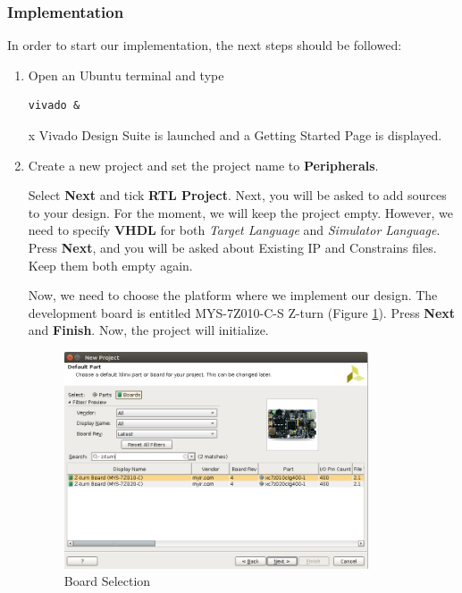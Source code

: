 \documentclass[letterpaper, portrait, margin=0.8in]{article}
\begin{document}

\clearpage

\subsubsection{Implementation}

In order to start our implementation, the next steps should be followed:

\begin{enumerate}
\item Open an Ubuntu terminal and type 
\begin{verbatim}
vivado &
\end{verbatim}
   x
Vivado Design Suite is launched and a Getting Started Page is displayed.

\item Create a new project and set the project name to \textbf{Peripherals}. 

Select \textbf{Next} and tick \textbf{RTL Project}. 
Next, you will be asked to add sources to your design. For the moment, we will keep the project empty. However, we need to specify \textbf{VHDL} for both \textit{Target Language} and \textit{Simulator Language}. Press \textbf{Next}, and you will be asked about Existing IP and Constrains files. Keep them both empty again.

Now, we need to choose the platform where we implement our design. The development board is entitled MYS-7Z010-C-S Z-turn (Figure \ref{fig:board}).  Press \textbf{Next} and \textbf{Finish}.  Now, the project will initialize.
\begin{figure}[h!]
    \centering
    \includegraphics[width=0.85\textwidth]{img/board.png}
    \caption{Board Selection}
    \label{fig:board}
\end{figure}
 

\end{enumerate}
\end{document}
